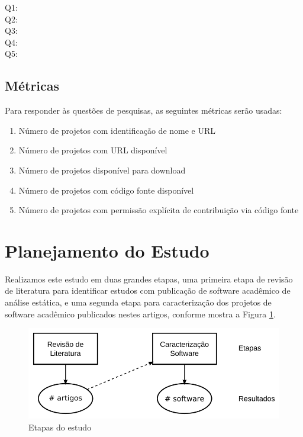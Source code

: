 \begin{description}
  \item [Q1:] \EstudoUmQuestaoUm
  \item [Q2:] \EstudoUmQuestaoDois
  \item [Q3:] \EstudoUmQuestaoTres
  \item [Q4:] \EstudoUmQuestaoQuatro
  \item [Q5:] \EstudoUmQuestaoCinco
\end{description}

\subsection{Métricas}

Para responder às questões de pesquisas, as seguintes métricas serão usadas:

\begin{enumerate}
  \item Número de projetos com identificação de nome e URL
  \item Número de projetos com URL disponível
  \item Número de projetos disponível para download
  \item Número de projetos com código fonte disponível
  \item Número de projetos com permissão explícita de contribuição via código fonte
\end{enumerate}


\section{Planejamento do Estudo} \label{estudo1:planejamento} %

Realizamos este estudo em duas grandes etapas, uma primeira etapa de revisão de
literatura para identificar estudos com publicação de software acadêmico de
análise estática, e uma segunda etapa para caracterização dos projetos de
software acadêmico publicados nestes artigos, conforme mostra a Figura
\ref{estudo1-etapas}.

\begin{figure}[h]
  \center
  \includegraphics[scale=0.4]{imagens/estudo1-etapas.png}
  \caption{Etapas do estudo}
  \label{estudo1-etapas}
\end{figure}

